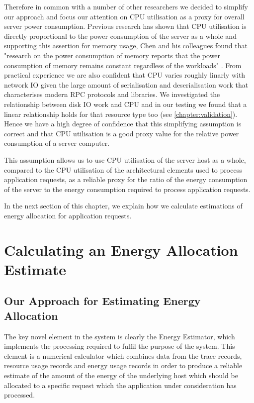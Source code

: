Therefore in common with a number of other researchers \cite{amsel2010-greentracker, yuki2014-compilingenergy, kim2014-fullstackenergy, mobius2014-powerest} we decided to simplify our approach and focus our attention on CPU utilisation as a proxy for overall server power consumption. Previous research \cite{bashroush2018_hardwarerefresh} has shown that CPU utilisation is directly proportional to the power consumption of the server as a whole and supporting this assertion for memory usage, Chen and his colleagues found that "research on the power consumption of memory reports that the power consumption of memory remains constant regardless of the workloads" \cite{chen2014-automatedanalysis}.  From practical experience we are also confident that CPU varies roughly linarly with network IO given the large amount of serialisation and deserialisation work that characterises modern RPC protocols and libraries.  We investigated the relationship between disk IO work and CPU and in our testing we found that a linear relationship holds for that resource type too (see \cref{chapter:validation}).  Hence we have a high degree of confidence that this simplifying assumption is correct and that CPU utilisation is a good proxy value for the relative power consumption of a server computer.  

This assumption allows us to use CPU utilisation of the server host as a whole, compared to the CPU utilisation of the architectural elements used to process application requests, as a reliable proxy for the ratio of the energy consumption of the server to the energy consumption required to process application requests.

In the next section of this chapter, we explain how we calculate estimations of energy allocation for application requests.

\section{Calculating an Energy Allocation Estimate}

\subsection{Our Approach for Estimating Energy Allocation}

The key novel element in the system is clearly the Energy Estimator, which implements the processing required to fulfil the purpose of the system.  This element is a numerical calculator which combines data from the trace records, resource usage records and energy usage records in order to produce a reliable estimate of the amount of the energy of the underlying host which should be allocated to a specific request which the application under consideration has processed.


